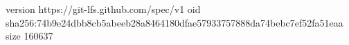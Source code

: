 version https://git-lfs.github.com/spec/v1
oid sha256:74b9e24dbb8cb5abeeb28a8464180dfae57933757888da74bebc7ef52fa51eaa
size 160637
